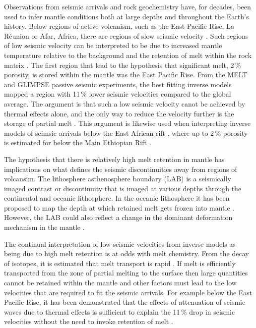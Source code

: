 Observations from seismic arrivals and rock geochemistry have, for decades, been used to infer mantle conditions both at large depths and throughout the Earth's history. Below regions of active volcanism, such as the East Pacific Rise, La Réunion or Afar, Africa, there are regions of slow seismic velocity \citep[e.g.][]{forsyth-etal-1998,mazzullo-etal-2017,bastow-etal-2005}. Such regions of low seismic velocity can be interpreted to be due to increased mantle temperature relative to the background and the retention of melt within the rock matrix \citep[e.g.][]{goes-etal-2012,armitage-etal-epsl-2015}. The first region that lead to the hypothesis that significant melt, 2\,\% porosity, is stored within the mantle was the East Pacific Rise. From the MELT and GLIMPSE passive seismic experiments, the best fitting inverse models mapped a region with 11\,\% lower seismic velocities compared to the global average. The argument is that such a low seismic velocity canot be achieved by thermal effects alone, and the only way to reduce the velocity further is the storage of partial melt \citep{harmon-etal-2009}. This argument is likewise used when interpreting inverse models of seimsic arrivals below the East African rift \citep[e.g.][]{gallacher-etal-2016,chambers-etal-2019}, where up to 2\,\% porosity is estimated for below the Main Ethiopian Rift \citep{chambers-etal-2019}. 

The hypothesis that there is relatively high melt retention in mantle has implications on what defines the seismic discontinuities away from regions of volcansim. The lithosphere asthenosphere boundary (LAB) is a seismically imaged contrast or discontinuity that is imaged at various depths through the continental and oceanic lithosphere. In the oceanic lithosphere it has been proposed to map the depth at which retained melt gets frozen into mantle \citep[e.g.][]{hirschmann-2010,mehouachi-2017}. However, the LAB could also reflect a change in the dominant deformation mechanism in the mantle \citep[e.g.][]{karato-2012,goes-etal-2012}.

The continual interpretation of low seismic velocities from inverse models as being due to high melt retention is at odds with melt chemistry. From the decay of isotopes, it is estimated that melt transport is rapid \citep[e.g.][]{elliot-2014}. If melt is efficiently transported from the zone of partial melting to the surface then large quantities cannot be retained within the mantle and other factors must lead to the low velocities that are required to fit the seismic arrivals. For example below the East Pacific Rise, it has been demonstrated that the effects of attenuation of seismic waves due to thermal effects is sufficient to explain the 11\,\% drop in seismic velocities without the need to invoke retention of melt \citep{goes-etal-2012}.

